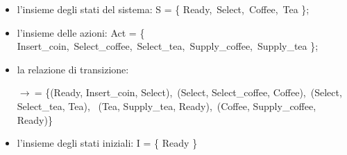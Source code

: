 \begin{itemize}
 \item l'insieme degli stati del sistema:  S = \{ Ready,\ Select,\ Coffee,\ Tea \};
 \item l'insieme delle azioni:  Act = \{ Insert\_coin,\ Select\_coffee,\ Select\_tea,\ Supply\_coffee,\ Supply\_tea \};
 \item la relazione di transizione:
 
$ \rightarrow\ $= \{(Ready, Insert\_coin, Select),\ (Select, Select\_coffee, Coffee),\ (Select, Select\_tea, Tea),
 \  (Tea, Supply\_tea, Ready),\ (Coffee, Supply\_coffee, Ready)\}

\item l'insieme degli stati iniziali: I = \{ Ready \}
\end{itemize}


